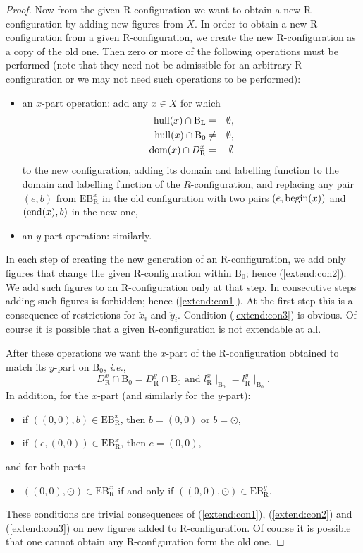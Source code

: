 \documentclass[final,nomarks]{dmtcs-episciences}
\newcommand{\dfbegin}[1]{\mbox{\rm begin}(#1)}
\newcommand{\dfend}[1]{\mbox{\rm end}(#1)}
\newcommand{\dfdomain}[1]{\mbox{\rm dom}(#1)}
\newcommand{\hull}[1]{\mathrm{hull}(#1)}\newcommand{\hullm}[1]{\mathrm{hull}^{*}(#1)}\newcommand{\block}{{\mathrm B}_0}\newcommand{\rblock}{{\mathrm B}_{\mathrm R}}\newcommand{\lblock}{{\mathrm B}_{\mathrm L}}
\newcommand{\confBegends}[2]{\mathrm{EB}^{#1}_{\mathrm #2}}
\newcommand{\confDom}[2]{D^{#1}_{\mathrm #2}}
\newcommand{\confLab}[2]{l^{#1}_{\mathrm #2}}
\newcommand{\confEnd}{\odot}
\newcommand{\ddx}{\ddot{x}}
\newcommand{\ddy}{\ddot{y}}
\begin{document}
\begin{proof}
Now from the given R-configuration we want to obtain a new
R-configuration by adding new figures from $X$. In order to
obtain a new R-configuration from a given R-configuration, we
create the new R-configuration as a copy of the old one. Then
zero or more of the following operations must be performed (note
that they need not be admissible for an arbitrary
R-configuration or we may not need such operations to be
performed):
\begin{itemize}
 \item an $x$-part operation:
   add any $x\in X$ for which
   \begin{eqnarray}
     \label{extend:con1}\hull{x}\cap\lblock & = & \emptyset,\\
     \label{extend:con2}\hull{x}\cap\block	 & \neq & \emptyset,\\
     \label{extend:con3}\dfdomain{x}\cap\confDom{x}{R} & = & \emptyset
   \end{eqnarray}
	  to the new configuration, adding its domain and labelling function to the domain and 
	  labelling function of the $R$-configuration,
	  and replacing any pair $(e,b)$ from $\confBegends{x}{R}$ in the old configuration with 
	  two pairs $(e,\dfbegin{x})$ and $(\dfend{x},b)$
	  in the new one,
 \item an $y$-part operation: similarly.
\end{itemize}
In each step of creating the new generation of an R-configuration, we add only figures that 
change the given R-configuration
within $\block$; hence (\ref{extend:con2}). We add such figures to an R-configuration only at 
that step. In consecutive steps adding such figures is forbidden; hence (\ref{extend:con1}). At 
the first step this is a consequence
of restrictions for $\ddx_i$ and $\ddy_i$. Condition (\ref{extend:con3}) is obvious. Of course it 
is possible that a given R-configuration is not extendable at all.

After these operations we want the $x$-part of the R-configuration obtained to match its 
$y$-part on $\block$, \textit{i.e.},
\begin{displaymath}
 \confDom{x}{R}\cap\block    = \confDom{y}{R}\cap\block \mbox{~and~}
 \confLab{x}{R}\mid_{\block} = \confLab{y}{R}\mid_{\block}.
\end{displaymath}
In addition, for the $x$-part (and similarly for the $y$-part):
\begin{itemize}
 \item if $((0,0),b)\in\confBegends{x}{R}$,
 then $b=(0,0)$ or $b=\confEnd$,
 \item if $(e,(0,0))\in\confBegends{x}{R}$,
 then $e=(0,0)$,
\end{itemize}
and for both parts
\begin{itemize}
 \item $((0,0),\confEnd)\in\confBegends{x}{R}$ if and only if $((0,0),\confEnd)\in\confBegends{y}{R}$.
\end{itemize}
These conditions are trivial consequences of
(\ref{extend:con1}), (\ref{extend:con2}) and (\ref{extend:con3})
on new figures added to R-configuration. Of course it is
possible that one cannot obtain any R-configuration form the old
one.


\end{proof}
\end{document}
